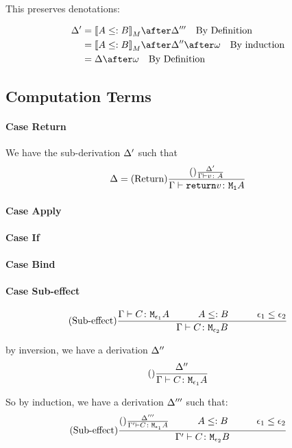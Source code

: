 \documentclass{report}
\begin{document}
This preserves denotations:

\begin{align}
    \D' & = \deno{A\subtype B}\after \D''' \qt{By Definition} \\
    & = \deno{A\subtype B}\after \D''\after\w \qt{By induction}\\
    & = \D\after\w \qt{By Definition}\\
\end{align}

\subsection{Computation Terms}
\paragraph{Case Return}
We have the sub-derivation $\Delta'$ such that
\begin{equation}
    \Delta = (\text{Return}) \frac{(\text{}) \frac{\Delta'}{\Gamma \vdash v \colon A}}{\Gamma \vdash \texttt{return} v \colon \texttt{M}_{\texttt{1}}{A}}
\end{equation}
\paragraph{Case Apply}
\paragraph{Case If}
\paragraph{Case Bind}
\paragraph{Case Sub-effect}


\begin{equation}
    \treerule{Sub-effect}{\gtyperelation{C}{\M{\e_1}{A}}\s\s A\subtype B\s\s \e_1\subeffect\e_2}{\gtyperelation{C}{\M{\e_2}{B}}}
\end{equation}

by inversion, we have a derivation $\Delta''$
\begin{equation}
    (\text{}) \frac{\Delta''}{\Gamma \vdash C \colon \texttt{M}_{\epsilon_1}{A}}
\end{equation}

So by induction, we have a derivation $\Delta'''$ such that:
\begin{equation}
    \treerule{Sub-effect}{\treerule{}{\D'''}{\typerelation{\G'}{C}{\M{\e_1}{A}}}\s\s A \subtype B\s\s \e_1\subeffect\e_2}{\typerelation{\G'}{C}{\M{\e_2}{B}}}
\end{equation}
\end{document}
